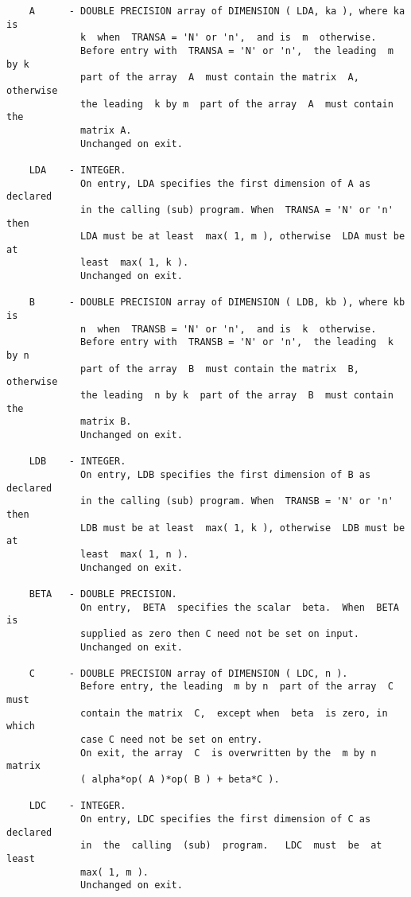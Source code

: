 \documentclass[10pt]{book}
\begin{document}
\begin{verbatim}
    A      - DOUBLE PRECISION array of DIMENSION ( LDA, ka ), where ka is
             k  when  TRANSA = 'N' or 'n',  and is  m  otherwise.
             Before entry with  TRANSA = 'N' or 'n',  the leading  m by k
             part of the array  A  must contain the matrix  A,  otherwise
             the leading  k by m  part of the array  A  must contain  the
             matrix A.
             Unchanged on exit.
 
    LDA    - INTEGER.
             On entry, LDA specifies the first dimension of A as declared
             in the calling (sub) program. When  TRANSA = 'N' or 'n' then
             LDA must be at least  max( 1, m ), otherwise  LDA must be at
             least  max( 1, k ).
             Unchanged on exit.
 
    B      - DOUBLE PRECISION array of DIMENSION ( LDB, kb ), where kb is
             n  when  TRANSB = 'N' or 'n',  and is  k  otherwise.
             Before entry with  TRANSB = 'N' or 'n',  the leading  k by n
             part of the array  B  must contain the matrix  B,  otherwise
             the leading  n by k  part of the array  B  must contain  the
             matrix B.
             Unchanged on exit.
 
    LDB    - INTEGER.
             On entry, LDB specifies the first dimension of B as declared
             in the calling (sub) program. When  TRANSB = 'N' or 'n' then
             LDB must be at least  max( 1, k ), otherwise  LDB must be at
             least  max( 1, n ).
             Unchanged on exit.
 
    BETA   - DOUBLE PRECISION.
             On entry,  BETA  specifies the scalar  beta.  When  BETA  is
             supplied as zero then C need not be set on input.
             Unchanged on exit.
 
    C      - DOUBLE PRECISION array of DIMENSION ( LDC, n ).
             Before entry, the leading  m by n  part of the array  C must
             contain the matrix  C,  except when  beta  is zero, in which
             case C need not be set on entry.
             On exit, the array  C  is overwritten by the  m by n  matrix
             ( alpha*op( A )*op( B ) + beta*C ).
 
    LDC    - INTEGER.
             On entry, LDC specifies the first dimension of C as declared
             in  the  calling  (sub)  program.   LDC  must  be  at  least
             max( 1, m ).
             Unchanged on exit.
\end{verbatim}
\newpage
\end{document}
